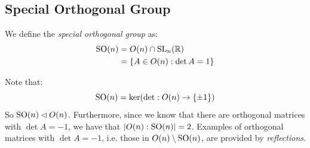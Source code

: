 \documentclass[../main.tex]{subfiles}
\begin{document}
\subsection{Special Orthogonal Group}
\begin{definition}
  We define the \textit{special orthogonal group} as:
  \begin{align*}
    \mathrm{SO}(n) &= O(n) \cap \mathrm{SL}_n(\mathbb{R}) \\
           &= \{A \in O(n) : \det A = 1\}
  \end{align*}
\end{definition}
Note that:
\[
  \mathrm{SO}(n) = \ker(\det: O(n) \to \{\pm 1\})
\]
So $\mathrm{SO}(n) \lhd O(n)$.
Furthermore, since we know that there are orthogonal matrices with $\det A = -1$, we have that $|O(n):\mathrm{SO}(n)| = 2$.
Examples of orthogonal matrices with $\det A = -1$, i.e. those in $O(n) \setminus \mathrm{SO}(n)$, are provided by \textit{reflections}.
\end{document}
